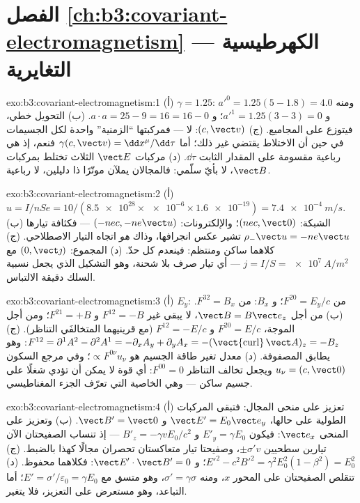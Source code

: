 \section*{الفصل \ref{ch:b3:covariant-electromagnetism} --- الكهرطيسية التغايرية}

\begin{solution}{exo:b3:covariant-electromagnetism:1}
(أ) $\gamma = 1.25$: ومنه $a'^0 = 1.25(5 - 1.8) = 4.0$ و $a'^1 = 1.25(3 -
3) = 0$؛ و $a\cdot a = 25 - 9 = 16 = 16 - 0$. (ب) التحويل
خطي، فيتوزع على المجاميع. (ج) $(c, \vect v)$: لا --- فمركبتها
``الزمنية'' واحدة لكل الجسيمات في حين أن الاختلاط
يقتضي غير ذلك؛ أما $\gamma(c, \vect v) = \dd x^\mu/\dd\tau$ فنعم، إذ هي
رباعية مقسومة على المقدار الثابت $\dd\tau$. (د) مركبات $\vect E$ الثلاث
تختلط بمركبات $\vect B$، لا بأيّ سلّمي: فالمجالان يملآن
موتّرًا ذا دليلين، لا رباعية.
\end{solution}

\begin{solution}{exo:b3:covariant-electromagnetism:2}
(أ) $u = I/nSe = 10/(\num{8.5e28} \times \num{e-6} \times
\num{1.6e-19}) = \qty{7.4e-4}{m/s}$. (ب) الشبكة: $(nec, \vect 0)$؛
والإلكترونات: $(-nec, -ne\vect u)$ --- فكثافة تيارها
$\rho_-\vect u = -ne\vect u$ تشير عكس انجرافها، وذاك
\emph{هو} اتجاه التيار الاصطلاحي. (ج) كلاهما ساكن ومنتظم: فينعدم كل حدّ. (د)
المجموع: $(0, \vect\jmath)$ مع $j = I/S = \qty{e7}{A/m^2}$ --- أي
تيار صرف بلا شحنة، وهو التشكيل الذي يجعل نسبية السلك
دقيقة الالتباس.
\end{solution}

\begin{solution}{exo:b3:covariant-electromagnetism:3}
(أ) $E_y$: من $F^{20} = E_y/c$؛ و $B_x$: من $F^{32} = B_x$. (ب) من أجل $\vect B
= B\vect e_z$، لا يبقى غير $F^{12} = -B$ و $F^{21} = +B$؛ ومن أجل الموجة،
$F^{20} = E/c$ و $F^{12} = -E/c$ (مع قرينيهما المتخالفَي التناظر). (ج)
$F^{12} = \partial^1A^2 - \partial^2A^1 = -\partial_xA_y +
\partial_yA_x = -(\operatorname{\vect{curl}}\vect A)_z = -B_z$:
وهو يطابق المصفوفة. (د) معدل تغير طاقة الجسيم
هو $\propto F^{0\nu}u_\nu$؛ وفي مرجع السكون $u_\nu = (c, \vect 0)$ ويجعل
تخالف التناظر $F^{00} = 0$: أي قوة لا يمكن أن تؤدي شغلًا على
جسيم ساكن --- وهي الخاصية التي تعرّف الجزء المغناطيسي.
\end{solution}

\begin{solution}{exo:b3:covariant-electromagnetism:4}
(أ) تعزيز على منحى المجال: فتبقى المركبات الطولية على حالها، $\vect
E' = E_0\vect e_y$ و $\vect B' = \vect 0$. (ب) وتعزيز على المنحى $\vect
e_x$: فيكون $E'_y = \gamma E_0$ و $B'_z = -\gamma vE_0/c^2$ --- إذ تنساب الصفيحتان
الآن تيارين سطحيين $\pm\sigma'v$، وصفيحتا تيار متعاكستان
تحصران مجالًا كهذا بالضبط. (ج) $E'^2 - c^2B'^2 =
\gamma^2E_0^2(1 - \beta^2) = E_0^2$؛ و $\vect E'\cdot\vect B' = 0$:
فكلاهما محفوظ. (د) تتقلص الصفيحتان على المحور $x$، ومنه $\sigma' =
\gamma\sigma$، وهو متسق مع $E' = \sigma'/\varepsilon_0 = \gamma
E_0$؛ أما التباعد، وهو مستعرض على التعزيز، فلا يتغير.
\end{solution}


